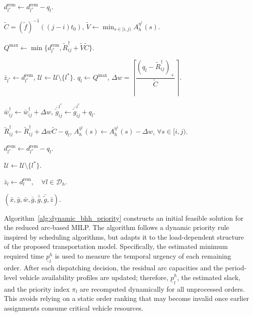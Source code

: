 \documentclass[10pt, reqno]{amsart}
\begin{document}
\begin{algorithm}[!htbp]
\begin{algorithmic}[1]
            \State 
            $d_{l^*}^{\mathrm{rem}}
            \leftarrow
            d_{l^*}^{\mathrm{rem}}-q_l$.
        \EndIf


        \State 
        $\widetilde C=(\widetilde f)^{-1}((j-i)t_0)$,
        $\widetilde V\leftarrow \min_{s\in[i,j)}A_h^{\eta^\dagger}(s)$.

        \State 
        $Q^{\max}
        \leftarrow
        \min\{
        d_{l^*}^{\mathrm{rem}},
        \widetilde R_{ij}^{\dagger}
        +\widetilde V\widetilde C
        \}$.

            $\bar z_{l^*}\leftarrow d_{l^*}^{\mathrm{rem}}$,
            $\mathcal U\leftarrow\mathcal U\setminus\{l^*\}$.
        \Else
            \State 
            $q_l\leftarrow Q^{\max}$,
            $\Delta w
            =
            \left\lceil
            \dfrac{(q_l-\widetilde R_{ij}^{\dagger})_+}{\widetilde C}
            \right\rceil$.

            \State 
            $\bar w_{ij}^{\dagger}
            \leftarrow
            \bar w_{ij}^{\dagger}+\Delta w$,
            $\bar{\widetilde g}_{ij}^{l^*}
            \leftarrow
            \bar{\widetilde g}_{ij}^{l^*}+q_l$.

            \State 
            $\widetilde R_{ij}^{\dagger}
            \leftarrow
            \widetilde R_{ij}^{\dagger}+\Delta w\widetilde C-q_l$,
            $A_h^{\eta^\dagger}(s)
            \leftarrow
            A_h^{\eta^\dagger}(s)-\Delta w$,
            $\forall s\in[i,j)$.

            \State 
            $d_{l^*}^{\mathrm{rem}}
            \leftarrow
            d_{l^*}^{\mathrm{rem}}-q_l$.
        \EndIf

    \EndIf

        $\mathcal U\leftarrow\mathcal U\setminus\{l^*\}$.
    \EndIf

\EndWhile

\State 
$\bar z_l\leftarrow d_l^{\mathrm{rem}},\quad \forall l\in\mathcal D_h$.

\State \Return 
$(\bar x,\bar y,\bar w,\bar g,\bar{\widehat g},\bar{\widetilde g},\bar z)$.

\end{algorithmic}
\end{algorithm}
Algorithm~\ref{alg:dynamic_bhh_priority} constructs an initial feasible solution for the reduced arc-based MILP. The algorithm follows a dynamic priority rule inspired by scheduling algorithms, but adapts it to the load-dependent structure of the proposed transportation model. Specifically, the estimated minimum required time $\underline p_l^h$ is used to measure the temporal urgency of each remaining order. After each dispatching decision, the residual arc capacities and the period-level vehicle availability profiles are updated; therefore, $\underline p_l^h$, the estimated slack, and the priority index $\pi_l$ are recomputed dynamically for all unprocessed orders. This avoids relying on a static order ranking that may become invalid once earlier assignments consume critical vehicle resources.
\end{document}
